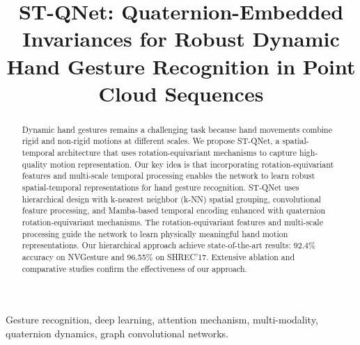 \documentclass[journal]{IEEEtran}
\theoremstyle{plain}
\begin{document}
\title{ST-QNet: Quaternion-Embedded Invariances for Robust Dynamic Hand Gesture Recognition in Point Cloud Sequences}
\author{
\and
{}
\and
{}
}

\maketitle

\begin{abstract}

Dynamic hand gestures remains a challenging task because hand movements combine rigid and non-rigid motions at different scales. We propose ST-QNet, a spatial-temporal architecture that uses rotation-equivariant mechanisms to capture high-quality motion representation. Our key idea is that incorporating rotation-equivariant features and multi-scale temporal processing enables the network to learn robust spatial-temporal representations for hand gesture recognition. ST-QNet uses hierarchical design with k-nearest neighbor (k-NN) spatial grouping, convolutional feature processing, and Mamba-based temporal encoding enhanced with quaternion rotation-equivariant mechanisms. The rotation-equivariant features and multi-scale processing guide the network to learn physically meaningful hand motion representations. Our hierarchical approach achieve state-of-the-art results: 92.4\% accuracy on NVGesture and 96.55\% on SHREC'17. Extensive ablation and comparative studies confirm the effectiveness of our approach.

\end{abstract}
\begin{IEEEkeywords}
Gesture recognition, deep learning, attention mechanism, multi-modality, quaternion dynamics, graph convolutional networks.
\end{IEEEkeywords}
\end{document}

